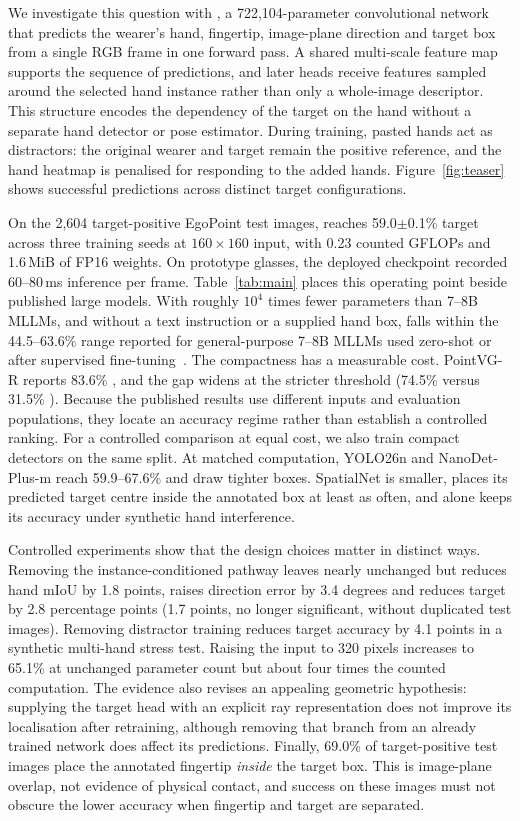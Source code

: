 We investigate this question with \model{}, a 722,104-parameter convolutional network that predicts the wearer's hand, fingertip, image-plane direction and target box from a single RGB frame in one forward pass. A shared multi-scale feature map supports the sequence of predictions, and later heads receive features sampled around the selected hand instance rather than only a whole-image descriptor. This structure encodes the dependency of the target on the hand without a separate hand detector or pose estimator. During training, pasted hands act as distractors: the original wearer and target remain the positive reference, and the hand heatmap is penalised for responding to the added hands. Figure~\ref{fig:teaser} shows successful predictions across distinct target configurations.

On the 2,604 target-positive EgoPoint test images, \model{} reaches 59.0$\pm$0.1\% target  across three training seeds at $160\times160$ input, with 0.23 counted GFLOPs and 1.6\,MiB of FP16 weights. On prototype glasses, the deployed checkpoint recorded 60--80\,ms inference per frame. Table~\ref{tab:main} places this operating point beside published large models. With roughly $10^4$ times fewer parameters than 7--8B MLLMs, and without a text instruction or a supplied hand box, \model{} falls within the 44.5--63.6\%  range reported for general-purpose 7--8B MLLMs used zero-shot or after supervised fine-tuning~\cite{li2026pointvgr}. The compactness has a measurable cost. PointVG-R reports 83.6\% , and the gap widens at the stricter threshold (74.5\% versus 31.5\% ). Because the published results use different inputs and evaluation populations, they locate an accuracy regime rather than establish a controlled ranking. For a controlled comparison at equal cost, we also train compact detectors on the same split. At matched computation, YOLO26n and NanoDet-Plus-m reach 59.9--67.6\%  and draw tighter boxes. SpatialNet is smaller, places its predicted target centre inside the annotated box at least as often, and alone keeps its accuracy under synthetic hand interference.

Controlled experiments show that the design choices matter in distinct ways. Removing the instance-conditioned pathway leaves  nearly unchanged but reduces hand mIoU by 1.8 points, raises direction error by 3.4 degrees and reduces target  by 2.8 percentage points (1.7 points, no longer significant, without duplicated test images). Removing distractor training reduces target accuracy by 4.1 points in a synthetic multi-hand stress test. Raising the input to 320 pixels increases  to 65.1\% at unchanged parameter count but about four times the counted computation. The evidence also revises an appealing geometric hypothesis: supplying the target head with an explicit ray representation does not improve its localisation after retraining, although removing that branch from an already trained network does affect its predictions. Finally, 69.0\% of target-positive test images place the annotated fingertip \emph{inside} the target box. This is image-plane overlap, not evidence of physical contact, and success on these images must not obscure the lower accuracy when fingertip and target are separated.

